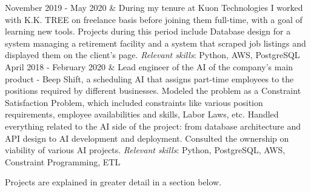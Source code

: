 \documentclass[]{cv-roald}
\begin{document}
\begin{tabularcv}
   November 2019 - May 2020   & 
                    \newline During my tenure at Kuon Technologies I worked with K.K. TREE on freelance basis before joining them full-time, with a goal of learning new tools. Projects during this period include Database design for a system managing a retirement facility and a system that scraped job listings and displayed them on the client's page.
                    \newline \textit{Relevant skills}: Python, AWS, PostgreSQL
                    \\[\vspacepar]
   April 2018 - February 2020       &   
                    \newline Lead engineer of the AI of the company's main product - Beep Shift, a scheduling AI that assigns part-time employees to the positions required by different businesses. Modeled the problem as a Constraint Satisfaction Problem, which included constraints like various position requirements, employee availabilities and skills, Labor Laws, etc.
                    \newline Handled everything related to the AI side of the project: from database architecture and API design to AI development and deployment.
                    \newline Consulted the ownership on viability of various AI projects.
                    \newline \textit{Relevant skills}: Python, PostgreSQL, AWS, Constraint Programming, ETL
\end{tabularcv}

Projects are explained in greater detail in a section below.
\end{document}
